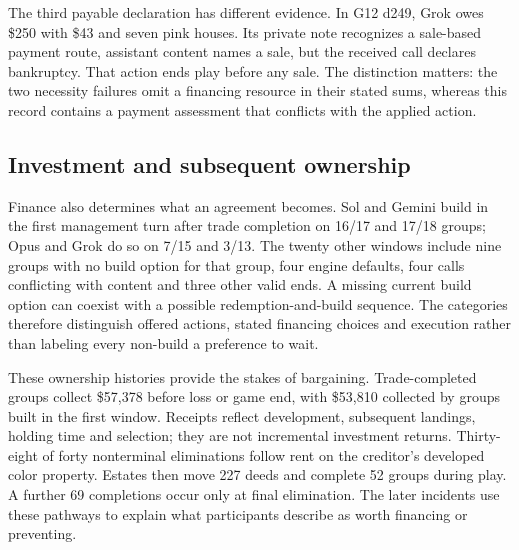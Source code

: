 The third payable declaration has different evidence. In G12 d249, Grok owes \$250 with \$43 and seven pink houses. Its private note recognizes a sale-based payment route, assistant content names a sale, but the received call declares bankruptcy. That action ends play before any sale. The distinction matters: the two necessity failures omit a financing resource in their stated sums, whereas this record contains a payment assessment that conflicts with the applied action.

\subsection{Investment and subsequent ownership}
Finance also determines what an agreement becomes. Sol and Gemini build in the first management turn after trade completion on 16/17 and 17/18 groups; Opus and Grok do so on 7/15 and 3/13. The twenty other windows include nine groups with no build option for that group, four engine defaults, four calls conflicting with content and three other valid ends. A missing current build option can coexist with a possible redemption-and-build sequence. The categories therefore distinguish offered actions, stated financing choices and execution rather than labeling every non-build a preference to wait.

These ownership histories provide the stakes of bargaining. Trade-completed groups collect \$57,378 before loss or game end, with \$53,810 collected by groups built in the first window. Receipts reflect development, subsequent landings, holding time and selection; they are not incremental investment returns. Thirty-eight of forty nonterminal eliminations follow rent on the creditor's developed color property. Estates then move 227 deeds and complete 52 groups during play. A further 69 completions occur only at final elimination. The later incidents use these pathways to explain what participants describe as worth financing or preventing.
